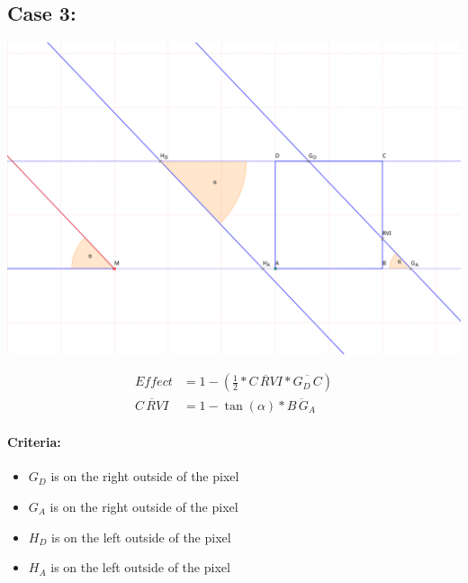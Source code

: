 \documentclass[a4paper,10pt,fleqn]{scrartcl}
\numberwithin{equation}{subsection}
\begin{document}
\subsection{Case 3:}
\begin{minipage}{\textwidth}
\includegraphics[width=\textwidth]{case3}
\end{minipage}
\begin{align}
Effect &= 1 - (\frac{1}{2} * \overline{C\,RVI} * \overline{G_D\,C})\\
\overline{C\,RVI} &=  1 - \tan(\alpha) * \overline{B\,G_A}
\end{align}
\paragraph{Criteria:}
\begin{itemize}
 \item $G_D$ is on the right outside of the pixel
 \item $G_A$ is on the right outside of the pixel
 \item $H_D$ is on the left outside of the pixel
 \item $H_A$ is on the left outside of the pixel
\end{itemize}
%
\end{document}
